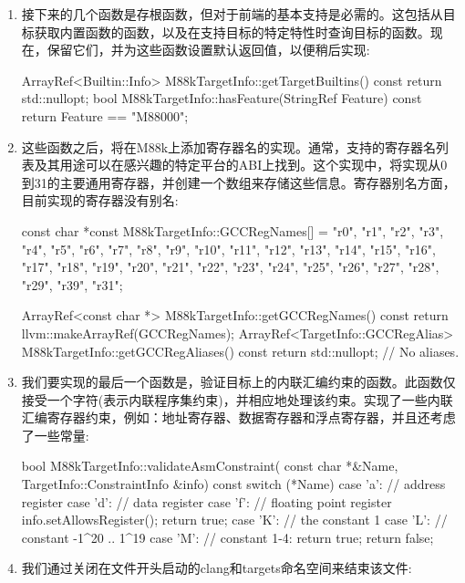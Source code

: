 \begin{enumerate}
\item
接下来的几个函数是存根函数，但对于前端的基本支持是必需的。这包括从目标获取内置函数的函数，以及在支持目标的特定特性时查询目标的函数。现在，保留它们，并为这些函数设置默认返回值，以便稍后实现:

\begin{cpp}
ArrayRef<Builtin::Info> M88kTargetInfo::getTargetBuiltins()
const {
    return std::nullopt;
}
bool M88kTargetInfo::hasFeature(StringRef Feature) const {
    return Feature == "M88000";
}
\end{cpp}

\item
这些函数之后，将在M88k上添加寄存器名的实现。通常，支持的寄存器名列表及其用途可以在感兴趣的特定平台的ABI上找到。这个实现中，将实现从0到31的主要通用寄存器，并创建一个数组来存储这些信息。寄存器别名方面，目前实现的寄存器没有别名:

\begin{cpp}
const char *const M88kTargetInfo::GCCRegNames[] = {
    "r0", "r1", "r2", "r3", "r4", "r5", "r6", "r7",
    "r8", "r9", "r10", "r11", "r12", "r13", "r14", "r15",
    "r16", "r17", "r18", "r19", "r20", "r21", "r22", "r23",
    "r24", "r25", "r26", "r27", "r28", "r29", "r39", "r31"};

ArrayRef<const char *> M88kTargetInfo::getGCCRegNames() const {
    return llvm::makeArrayRef(GCCRegNames);
}
ArrayRef<TargetInfo::GCCRegAlias>
M88kTargetInfo::getGCCRegAliases() const {
    return std::nullopt; // No aliases.
}
\end{cpp}

\item
我们要实现的最后一个函数是，验证目标上的内联汇编约束的函数。此函数仅接受一个字符(表示内联程序集约束)，并相应地处理该约束。实现了一些内联汇编寄存器约束，例如：地址寄存器、数据寄存器和浮点寄存器，并且还考虑了一些常量:

\begin{cpp}
bool M88kTargetInfo::validateAsmConstraint(
const char *&Name, TargetInfo::ConstraintInfo &info) const {
    switch (*Name) {
    case 'a': // address register
    case 'd': // data register
    case 'f': // floating point register
        info.setAllowsRegister();
        return true;
    case 'K': // the constant 1
    case 'L': // constant -1^20 .. 1^19
    case 'M': // constant 1-4:
        return true;
    }
    return false;
}
\end{cpp}

\item
我们通过关闭在文件开头启动的clang和targets命名空间来结束该文件:

\begin{cpp}
} // namespace targets
} // namespace clang
\end{cpp}

\end{enumerate}

